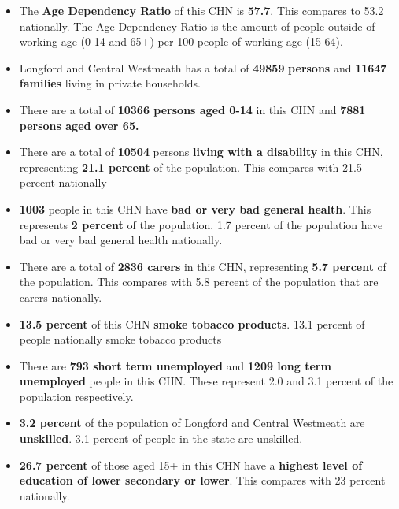 \documentclass{article}
\begin{document}
\begin{itemize}

\item The \textbf{Age Dependency Ratio} of this CHN is  \textbf{57.7}. This compares to 53.2 nationally. The Age Dependency Ratio is the amount of people outside of working age (0-14 and 65+) per 100 people of working age (15-64). 

\item Longford and Central Westmeath has a total of \textbf{\num{49859}} \textbf{persons} and  \textbf{\num{11647}} \textbf{families} living in private households.

\item There are a total of \textbf{\num{10366} persons aged 0-14} in this CHN and \textbf{\num{7881} persons aged over 65.} 

\item There are a total of \textbf{\num{10504}} persons \textbf{living with a disability} in this CHN, representing \textbf{21.1 percent} of the population. This compares with  21.5 percent nationally

\item \textbf{\num{1003}} people in this CHN have \textbf{bad or very bad general health}. This represents \textbf{2 percent} of the population. 1.7 percent of the population have bad or very bad general health nationally. 

\item There are a total of \textbf{\num{2836} carers} in this CHN, representing \textbf{5.7 percent} of the population. This compares with 5.8 percent of the population that are carers nationally. 

\item \textbf{13.5 percent} of this CHN \textbf{smoke tobacco products}. 13.1 percent of people nationally smoke tobacco products

\item There are \textbf{\num{793} short term unemployed} and \textbf{\num{1209} long term unemployed} people in this CHN. These represent 2.0 and 3.1 percent of the population respectively.

\item  \textbf{3.2 percent} of the population of Longford and Central Westmeath are \textbf{unskilled}. 3.1 percent of people in the state are unskilled.

\item \textbf{26.7 percent} of those aged 15+ in this CHN have a \textbf{highest level of education of lower secondary or lower}. This compares with 23 percent nationally. 


\end{itemize}
\end{document}
